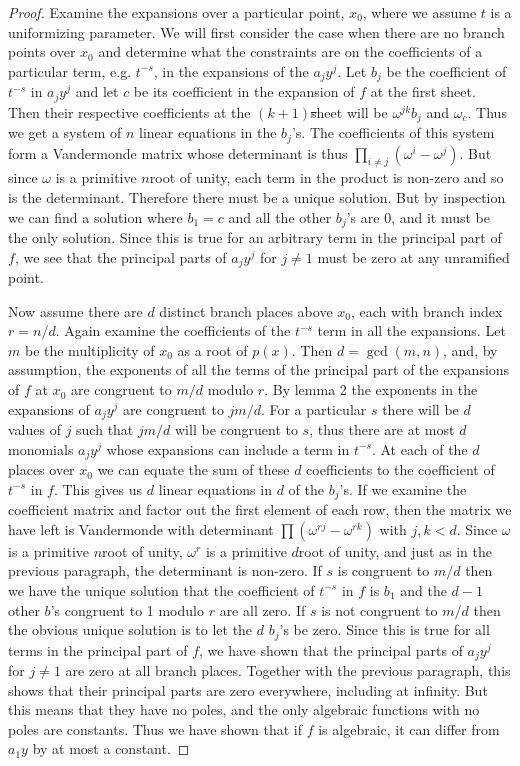 \begin{proof}
Examine the expansions over a particular point, $x_0$,
where we assume $t$ is a uniformizing parameter.
We will first consider the case when there are no branch points
over $x_0$ and determine what the constraints are on the coefficients
of a particular term, e.g. $t^{-s}$, in the expansions of the $a_j y^j$.
Let $b_j$ be the coefficient of $t^{-s}$ in $a_j y^j$ and let $c$ be its
coefficient in the expansion of $f$ at the first sheet.  Then
their respective coefficients at the $(k+1)$\st sheet will be
$\omega^{jk}b_j$ and $\omega_ c$.  Thus we get a system of $n$ linear
equations in the $b_j$'s.  The coefficients of this system form a
Vandermonde matrix whose determinant is thus 
$\prod_{i \not= j} (\omega^i-\omega^j)$. 
But since $\omega$ is a primitive $n$\th root of unity, each term in
the product is non-zero and so is the determinant.  Therefore
there must be a unique solution.  But by inspection we can
find a solution where $b_1=c$ and all the other $b_j$'s are $0$, and
it must be the only solution.  Since this is true for an
arbitrary term in the principal part of $f$, we see that
the principal parts of $a_j y^j$ for $j \not= 1$ must be zero at
any unramified point.

Now assume there are $d$ distinct branch places above
$x_0$, each with branch index $r=n/d$.  Again examine the
coefficients of the $t^{-s}$ term in all the expansions.  Let $m$
be the multiplicity of $x_0$ as a root of $p(x)$.  Then $d=\gcd(m,n)$,
and, by assumption,
the exponents of all the terms of the principal part of
the expansions of $f$ at $x_0$ are congruent to $m/d$ modulo $r$.
By lemma 2 the exponents in the expansions of $a_j y^j$ are congruent to
$jm/d$.  For a particular $s$ there will be $d$ values of $j$
such that $jm/d$ will be congruent to $s$, thus there are at most
$d$ monomials $a_j y^j$ whose expansions can include  a term in $t^{-s}$.
At each of the $d$ places over $x_0$ we can equate the sum of these $d$
coefficients to the coefficient of $t^{-s}$ in $f$.  This gives us
$d$ linear equations in $d$ of the $b_j$'s.  If we examine the coefficient
matrix and factor out the first element of each row, then the
matrix we have left is Vandermonde with determinant 
$\prod (\omega^{rj}-\omega^{rk})$  with $j,k<d$.  Since $\omega$ is a
primitive $n$\th root 
of unity, $\omega^r$ is a primitive $d$\th root of unity, and just as in 
the previous paragraph, the determinant is non-zero.  If $s$ is congruent
to $m/d$ then we have the unique solution that the coefficient of
$t^{-s}$ in $f$ is $b_1$ and the $d-1$ other $b$'s congruent to 1 modulo
$r$ are all zero.  If $s$ is not congruent to $m/d$ then the obvious unique
solution is to let the $d$ $b_j$'s be zero.  Since this is true for
all terms in the principal part of $f$, we have shown that the
principal parts of $a_j y^j$ for $j \not= 1$ are zero at all branch places.
Together with the previous paragraph, this shows that their principal
parts are zero everywhere, including at infinity.  But this means that they
have no poles, and the only algebraic functions with no poles are
constants.  Thus we have shown that if $f$ is algebraic, it can differ from
$a_1 y$ by at most a constant. 
\end{proof}


